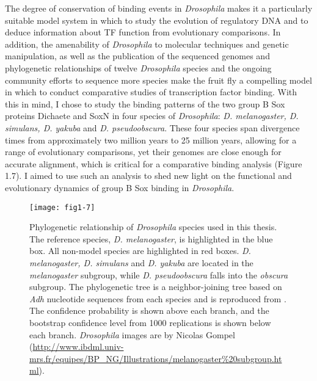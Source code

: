 The degree of conservation of binding events in \emph{Drosophila} makes it a particularly suitable model system in which to study the evolution of regulatory DNA and to deduce information about TF function from evolutionary comparisons. In addition, the amenability of \emph{Drosophila} to molecular techniques and genetic manipulation, as well as the publication of the sequenced genomes and phylogenetic relationships of twelve \emph{Drosophila} species \citep{clark_evolution_2007} and the ongoing community efforts to sequence more species make the fruit fly a compelling model in which to conduct comparative studies of transcription factor binding. With this in mind, I chose to study the binding patterns of the two group B Sox proteins Dichaete and SoxN in four species of \emph{Drosophila}: \emph{D. melanogaster, D. simulans, D. yakuba} and \emph{D. pseudoobscura}. These four species span divergence times from approximately two million years to 25 million years, allowing for a range of evolutionary comparisons, yet their genomes are close enough for accurate alignment, which is critical for a comparative binding analysis \citep{russo_molecular_1995} (Figure 1.7). I aimed to use such an analysis to shed new light on the functional and evolutionary dynamics of group B Sox binding in \emph{Drosophila}.

\begin{figure}
\centering
\texttt{[image: fig1-7]}
\caption{Phylogenetic relationship of \emph{Drosophila} species used in this thesis. The reference species, \emph{D. melanogaster}, is highlighted in the blue box. All non-model species are highlighted in red boxes. \emph{D. melanogaster, D. simulans} and \emph{D. yakuba} are located in the \emph{melanogaster} subgroup, while \emph{D. pseudoobscura} falls into the \emph{obscura} subgroup. The phylogenetic tree is a neighbor-joining tree based on \emph{Adh} nucleotide sequences from each species and is reproduced from \citet{russo_molecular_1995}. The confidence probability is shown above each branch, and the bootstrap confidence level from 1000 replications is shown below each branch. \emph{Drosophila} images are by Nicolas Gompel (\url{http://www.ibdml.univ-mrs.fr/equipes/BP_NG/Illustrations/melanogaster\%20subgroup.html}).}
\label{Figure 1.7}
\end{figure}

